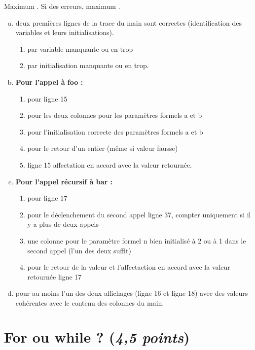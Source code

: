 \begin{baremeenv}
 Maximum . Si des erreurs, maximum .
  \begin{enumerate}[(a)]
\item {} deux premières lignes de la trace du main sont correctes
  (identification des variables et leurs initialisations).
  \begin{enumerate}[$\ast$]
  \item {} par variable manquante ou en trop
  \item {} par initialisation manquante ou en trop.
  \end{enumerate}
\item {} \textbf{Pour l'appel à foo :}
  \begin{enumerate}[$\ast$]
  \item {} pour  ligne 15
  \item {} pour les deux colonnes pour les paramètres formels a
    et b
  \item {} pour l'initialisation correcte des paramètres formels a
    et b
\item {} pour le retour d'un entier (même si valeur fausse)
\item {} ligne 15 affectation en accord avec la valeur retournée.
 \end{enumerate}
\item {}  \textbf{Pour l'appel récursif à bar :}
  \begin{enumerate}[$\ast$]
  \item {} pour  ligne 17
  \item {} pour le déclenchement du second appel ligne 37,
    compter uniquement  si il y a plus de deux appels
  \item {} une colonne pour le paramètre formel n bien
    initialisé à 2 ou à 1 dans le second appel (l'un des deux suffit)
  \item {} pour le retour de la valeur et l'affectaction en
    accord avec la valeur retournée ligne 17
\end{enumerate}
\item {} pour au moins l'un des deux affichages (ligne 16 et
  ligne 18) avec des valeurs cohérentes avec le contenu des colonnes
  du main.
\end{enumerate}
\end{baremeenv}

\section{For ou while ? (\emph{4,5 points})}

